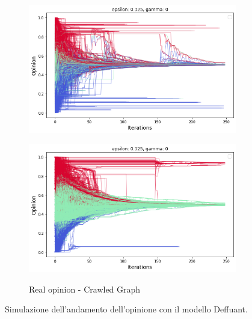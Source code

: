 \begin{figure}[ht]
\begin{subfigure}{.4\textwidth}
            \includegraphics[scale=.25]{Opinion dynamics/random_crawled_0_032.png}
            \label{fig:rdm_crw_0_032}
        \end{subfigure}
        \centering
        \begin{subfigure}{.4\textwidth}
            \caption{Real opinion - Crawled Graph}
            \includegraphics[scale=.25] {Opinion dynamics/real_crawled_0_032.png}
            \label{fig:real_crw_0_032}
        \end{subfigure}
        \caption{Simulazione dell'andamento dell'opinione con il modello Deffuant.}
        \label{fig:Deff}
    \end{figure}
    
